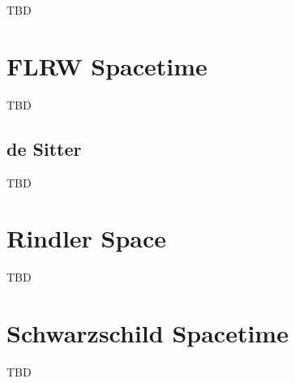 TBD
\section{FLRW Spacetime}
TBD
\subsection{de Sitter}
TBD
\section{Rindler Space}
TBD
\section{Schwarzschild Spacetime}
TBD